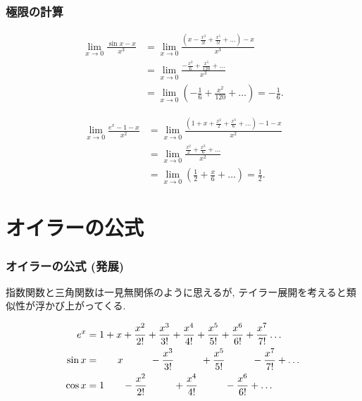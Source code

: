 \documentclass[dvipdfmx,cjk,10.2pt]{beamer}
\theoremstyle{definition}
\begin{document}


\begin{frame}
\frametitle{極限の計算}

\vspace{-5mm}

\begin{align*}
\lim_{x \to 0} \frac{\sin x -x}{x^3} & = \lim_{x \to 0} \frac{(x -\frac{x^3}{3!}+\frac{x^5}{5!}+\dots) -x}{x^3} \\
& =   \lim_{x \to 0} \frac{-\frac{x^3}{6}+\frac{x^5}{120}+\dots}{x^3} \\
& =   \lim_{x \to 0} (-\frac{1}{6}+\frac{x^2}{120}+\dots ) = -\frac{1}{6}. 
\end{align*}

\begin{align*}
\lim_{x \to 0} \frac{e^x-1-x}{x^2} &=  \lim_{x \to 0} \frac{(1+x+\frac{x^2}{2}+\frac{x^3}{6}+\dots )-1-x}{x^2} \\
& = \lim_{x \to 0} \frac{\frac{x^2}{2}+\frac{x^3}{6}+\dots}{x^2} \\
& = \lim_{x \to 0} (\frac{1}{2}+\frac{x}{6}+\dots)= \frac{1}{2}.  
\end{align*}

\end{frame}





\section{オイラーの公式}

\begin{frame}
\frametitle{オイラーの公式 (発展)}

指数関数と三角関数は一見無関係のように思えるが, テイラー展開を考えると類似性が浮かび上がってくる. 

\begin{align*}
e^x & = 1+x+\frac{x^2}{2!}+\frac{x^3}{3!}+\frac{x^4}{4!}+\frac{x^5}{5!}+\frac{x^6}{6!}+\frac{x^7}{7!}\dots \\
\sin x &=   \hspace{6.5mm} x  \hspace{9.5mm}   -\frac{x^3}{3!}  \hspace{9.5mm} +\frac{x^5}{5!} \hspace{9.5mm} -\frac{x^7}{7!} +  \dots  \\
\cos x &= 1   \hspace{6.5mm}  -\frac{x^2}{2!}   \hspace{9.5mm} +\frac{x^4}{4!}   \hspace{9.5mm} -\frac{x^6}{6!} +\dots 
\end{align*}

\end{frame}
\end{document}
